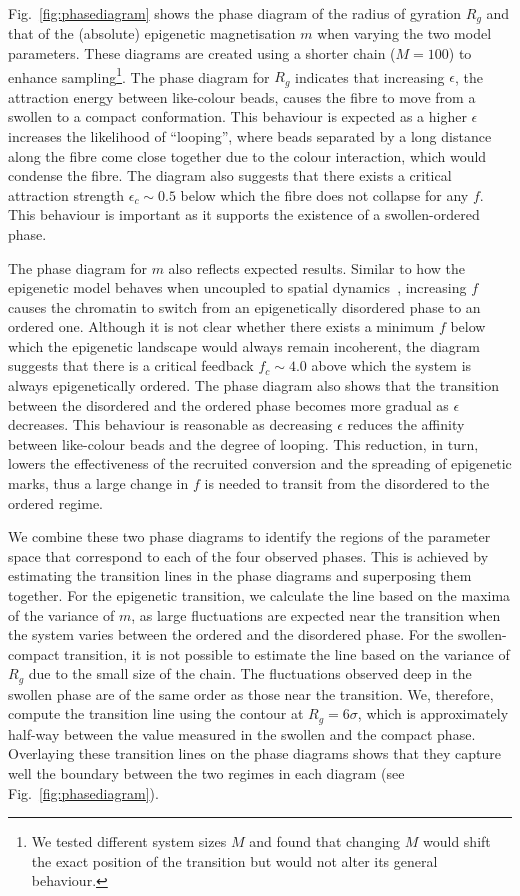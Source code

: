 \documentclass[12pt]{article}
\begin{document}
Fig.~\ref{fig:phasediagram} shows the phase diagram of the radius of gyration $R_g$ and that of the (absolute) epigenetic magnetisation $m$ when varying the two model parameters. These diagrams are created using a shorter chain ($M = 100$) to enhance sampling\footnote{We tested different system sizes $M$ and found that changing $M$ would shift the exact position of the transition but would not alter its general behaviour.}. The phase diagram for $R_g$ indicates that increasing $\epsilon$, the attraction energy between like-colour beads, causes the fibre to move from a swollen to a compact conformation. This behaviour is expected as a higher $\epsilon$ increases the likelihood of ``looping'', where beads separated by a long distance along the fibre come close together due to the colour interaction, which would condense the fibre. The diagram also suggests that there exists a critical attraction strength $\epsilon_c \sim 0.5$ below which the fibre does not collapse for any $f$. This behaviour is important as it supports the existence of a swollen-ordered phase. 

The phase diagram for $m$ also reflects expected results. Similar to how the epigenetic model behaves when uncoupled to spatial dynamics~\cite{dodd2007}, increasing $f$ causes the chromatin to switch from an epigenetically disordered phase to an ordered one. Although it is not clear whether there exists a minimum $f$ below which the epigenetic landscape would always remain incoherent, the diagram suggests that there is a critical feedback $f_c \sim 4.0$  above which the system is always epigenetically ordered. The phase diagram also shows that the transition between the disordered and the ordered phase becomes more gradual as $\epsilon$ decreases. This behaviour is reasonable as decreasing $\epsilon$ reduces the affinity between like-colour beads and the degree of looping. This reduction, in turn, lowers the effectiveness of the recruited conversion and the spreading of epigenetic marks, thus a large change in $f$ is needed to transit from the disordered to the ordered regime.

We combine these two phase diagrams to identify the regions of the parameter space that correspond to each of the four observed phases. This is achieved by estimating the transition lines in the phase diagrams and superposing them together. For the epigenetic transition, we calculate the line based on the maxima of the variance of $m$, as large fluctuations are expected near the transition when the system varies between the ordered and the disordered phase. For the swollen-compact transition, it is not possible to estimate the line based on the variance of $R_g$ due to the small size of the chain. The fluctuations observed deep in the swollen phase are of the same order as those near the transition. We, therefore, compute the transition line using the contour at $R_g  = 6\sigma$, which is approximately half-way between the value measured in the swollen and the compact phase. Overlaying these transition lines on the phase diagrams shows that they capture well the boundary between the two regimes in each diagram (see Fig.~\ref{fig:phasediagram}).
\end{document}
